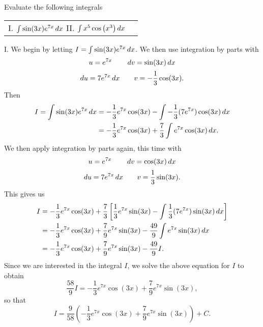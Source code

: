 \documentclass[]{ximera}
\begin{document}
\pagebreak

\begin{problem}

Evaluate the following integrals

\begin{center}
\begin{tabular}{ll}
I. $\int \sin(3x) e^{7x} \mathop{}\!d x$ \hspace{.5in} II. $\int x^5 \cos \left( x^3 \right) \mathop{}\!d x$ 
\end{tabular}
\end{center}
	
\end{problem}

\begin{freeResponse}
I. We begin by letting $I = \int \sin(3x) e^{7x} \mathop{}\!d x$.  
	We then use integration by parts with
		\[
		u = e^{7x} \qquad \mathop{}\!d v = \sin(3x) \mathop{}\!d x
		\]
		\[
		\mathop{}\!d u = 7e^{7x} \mathop{}\!d x \qquad v = -\frac{1}{3} \cos(3x).
		\]
	Then
		\begin{align*}
		I = \int \sin(3x) e^{7x} \mathop{}\!d x &= -\frac{1}{3} e^{7x} \cos(3x) - \int -\frac{1}{3} (7e^{7x}) \cos(3x) \mathop{}\!d x  \\
		 &= -\frac{1}{3} e^{7x} \cos(3x) + \frac{7}{3} \int e^{7x} \cos(3x) \mathop{}\!d x.
		\end{align*}
	We then apply integration by parts again, this time with
		\[
		u = e^{7x} 		\qquad	\mathop{}\!d v = \cos(3x) \mathop{}\!d x
		\]
		\[
		\mathop{}\!d u = 7e^{7x} \mathop{}\!d x 	\qquad	v = \frac{1}{3} \sin(3x).
		\]
	This gives us
		\begin{align*}
		I &= -\frac{1}{3} e^{7x} \cos(3x) + \frac{7}{3} \left[ \frac{1}{3} e^{7x} \sin(3x) - \int \frac{1}{3} (7e^{7x}) \sin(3x) \mathop{}\!d x \right]  \\
				&= -\frac{1}{3} e^{7x} \cos(3x) + \frac{7}{9} e^{7x} \sin(3x) - \frac{49}{9} \int e^{7x} \sin(3x) \mathop{}\!d x  \\
		&= -\frac{1}{3} e^{7x} \cos(3x) + \frac{7}{9} e^{7x} \sin(3x) - \frac{49}{9} I.
		\end{align*}
		Since we are interested in the integral $I$, we solve the above equation for $I$ to obtain
		$$
		\frac{58}{9} I = -\frac{1}{3} e^{7x} \cos(3x) + \frac{7}{9} e^{7x} \sin(3x),
		$$
		so that 
		$$
		I = \frac{9}{58} \left( -\frac{1}{3} e^{7x} \cos(3x) + \frac{7}{9} e^{7x} \sin(3x) \right) + C.
		$$
		

\end{freeResponse}
\end{document}
